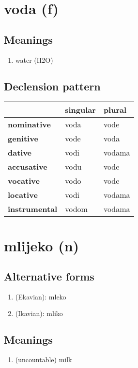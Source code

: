 \filbreak
\section{voda (f)}
\subsection*{Meanings}
\begin{enumerate}
\item water (H2O)
\end{enumerate}
\subsection*{Declension pattern}
\begin{tabularx}{\linewidth}{Xll}
\toprule
{} & singular &  plural \\
\midrule
\textbf{nominative  } &     voda &    vode \\
\textbf{genitive    } &     vode &    voda \\
\textbf{dative      } &     vodi &  vodama \\
\textbf{accusative  } &     vodu &    vode \\
\textbf{vocative    } &     vodo &    vode \\
\textbf{locative    } &     vodi &  vodama \\
\textbf{instrumental} &    vodom &  vodama \\
\bottomrule
\end{tabularx}

\filbreak
\section{mlijeko (n)}
\subsection*{Alternative forms}
\begin{enumerate}
\item (Ekavian): mleko
\item (Ikavian): mliko
\end{enumerate}
\subsection*{Meanings}
\begin{enumerate}
\item (uncountable) milk
\end{enumerate}
